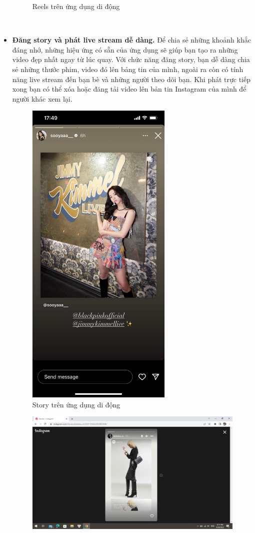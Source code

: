 \begin{itemize}
\begin{figure}[h!]
        \caption{Reels trên ứng dụng di động}
        \label{fig:my_label}
    \end{figure}
\\
\newpage
    \item \textbf{Đăng story và phát live stream dễ dàng.} Để chia sẻ những khoảnh khắc đáng nhớ, những hiệu ứng có sẵn của ứng dụng sẽ giúp bạn tạo ra những video đẹp nhất ngay từ lúc quay. Với chức năng đăng story, bạn dễ dàng chia sẻ những thước phim, video đó lên bảng tin của mình, ngoài ra còn có tính năng live stream đến bạn bè và những người theo dõi bạn. Khi phát trực tiếp xong bạn có thể xóa hoặc đăng tải video lên bản tin Instagram của mình để người khác xem lại.\\ \par
    \begin{figure}[h!]
        \centering
        \includegraphics[width=7cm]{Images/chapter 2/instagram/story_app.jpg}
        \caption{Story trên ứng dụng di động}
        \label{fig:my_label}
    \end{figure}
    \begin{figure}[h!]
        \centering
        \includegraphics[width=13cm]{Images/chapter 2/instagram/story_web.png}

\end{figure}
\end{itemize}
